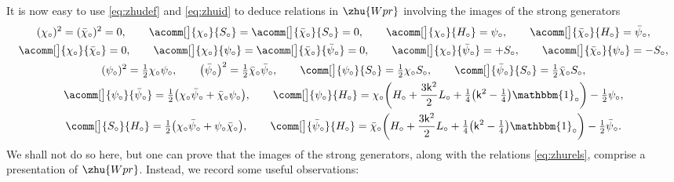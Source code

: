 \documentclass[10pt,a4paper]{amsart}
\numberwithin{equation}{section}
\newcommand{\wun}{\mathbbm{1}} %
\newcommand{\bchi}{\bar{\chi}{}} %
\newcommand{\bpsi}{\bar{\psi}{}} %
\newcommand{\kk}{\mathsf{k}} %
\DeclarePairedDelimiter{\brac}{\lparen}{\rparen} %
\newcommand{\VOA}[1]{\mathsf{#1}} %
\newcommand{\uwalg}[2]{\VOA{W}^{#1}_{\mathrm{#2}}} %
\newcommand{\upr}[1][\kk]{\uwalg{#1}{pr}} %
\newcommand{\zh}[1]{#1_{\circ}} %
\def\smash#1{#1}
\def\upr{Wpr}
\begin{document}
It is now easy to use \eqref{eq:zhudef} and \eqref{eq:zhuid} to deduce relations in \smash{$\zhu{\upr}$} involving the images of the strong generators
\begin{gather}
			(\zh{\chi})^2 = (\zh{\bchi})^2 = 0,\qquad
			\acomm[\big]{\zh{\chi}}{\zh{S}} = \acomm[\big]{\zh{\bchi}}{\zh{S}} = 0,\qquad
			\acomm[\big]{\zh{\chi}}{\zh{H}} = \zh{\psi},\qquad
			\acomm[\big]{\zh{\bchi}}{\zh{H}} = \zh{\bpsi},\nonumber
			\\
			\acomm[\big]{\zh{\chi}}{\zh{\bchi}} = 0,\qquad
			\acomm[\big]{\zh{\chi}}{\zh{\psi}} = \acomm[\big]{\zh{\bchi}}{\zh{\bpsi}} = 0,\qquad
			\acomm[\big]{\zh{\chi}}{\zh{\bpsi}} = +\zh{S},\qquad
			\acomm[\big]{\zh{\bchi}}{\zh{\psi}} = -\zh{S},\nonumber
		\\
		(\zh{\psi})^2 = \tfrac{1}{2}\zh{\chi}\zh{\psi}, \qquad
		\big(\zh{\bpsi}\big)^2 = \tfrac{1}{2}\zh{\bchi}\zh{\bpsi}, \qquad
		\comm[\big]{\zh{\psi}}{\zh{S}} = \tfrac{1}{2}\zh{\chi}\zh{S}, \qquad
		\comm[\big]{\zh{\bpsi}}{\zh{S}} = \tfrac{1}{2}\zh{\bchi}\zh{S},\label{eq:zhurels}
		\\
			\acomm[\big]{\zh{\psi}}{\zh{\bpsi}} = \tfrac{1}{2}\brac[\big]{\zh{\chi}\zh{\bpsi} + \zh{\bchi}\zh{\psi}}, \qquad
			\comm[\big]{\zh{\psi}}{\zh{H}} = \zh{\chi}\brac[\bigg]{\zh{H}+\frac{3\kk^2}{2}\zh{L}+\tfrac{1}{4}\big(\kk^2-\tfrac{1}{4}\big)\zh{\wun}} - \tfrac{1}{2}\zh{\psi},\nonumber
			\\
			\comm[\big]{\zh{S}}{\zh{H}} = \tfrac{1}{2}\brac[\big]{\zh{\chi}\zh{\bpsi} + \zh{\psi}\zh{\bchi}}, \qquad
			\comm[\big]{\zh{\bpsi}}{\zh{H}} = \zh{\bchi}\brac[\bigg]{\zh{H}+\frac{3\kk^2}{2}\zh{L}+\tfrac{1}{4}\bigl(\kk^2-\tfrac{1}{4}\bigr)\zh{\wun}} - \tfrac{1}{2}\zh{\bpsi}.\nonumber
\end{gather}
We shall not do so here, but one can prove that the images of the strong generators, along with the relations \eqref{eq:zhurels}, comprise a presentation of \smash{$\zhu{\upr}$}.
Instead, we record some useful observations:
\end{document}
